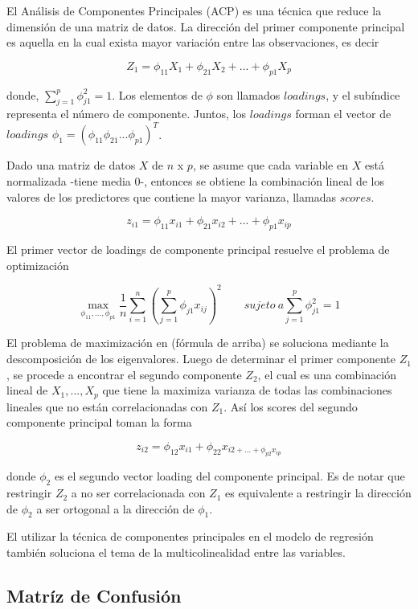 \documentclass[a4paper,12pt]{Latex/Classes/PhDthesisPSnPDF}
\begin{document}
El Análisis de Componentes Principales (ACP) es una técnica que reduce la dimensión de una matriz de datos. La dirección del primer componente principal es aquella en la cual exista mayor variación entre las observaciones, es decir

$$ Z_{1} = \phi_{11}X_{1} + \phi_{21}X_{2} + ... + \phi_{p1}X_{p} $$

donde, $ \sum_{j=1}^{p} \phi_{j1}^{2} = 1 $. Los elementos de $ \phi $ son llamados $loadings$, y el subíndice representa el número de componente. Juntos, los $loadings$ forman el vector de $loadings$ $\phi_{1} = (\phi_{11} \phi_{21}... \phi_{p1})^T$.

Dado una matriz de datos $X$ de $n$ x $p$, se asume que cada variable en $X$ está normalizada -tiene media 0-, entonces se obtiene la combinación lineal de los valores de los predictores que contiene la mayor varianza, llamadas $scores$.

$$ z_{i1} = \phi_{11} x_{i1} + \phi_{21} x_{i2} + ... + \phi_{p1} x_{ip} $$

El primer vector de loadings de componente principal resuelve el problema de optimización

$$ \max_{\phi_{11}, ..., \phi_{p1}}
\frac{1}{n} \sum_{i = 1}^{n} (\sum_{j=1}^{p} \phi_{j1} x_{ij})^2
\qquad sujeto \ a  \sum_{j=1}^{p} \phi_{j1}^{2} = 1
$$

El problema de maximización en (fórmula de arriba) se soluciona mediante la descomposición de los eigenvalores. Luego de determinar el primer componente $Z_{1}$, se procede a encontrar el segundo componente $Z_{2}$, el cual es una combinación lineal de $ X_{1}, ..., X_{p} $ que tiene la maximiza varianza de todas las combinaciones lineales que no están correlacionadas con $Z_{1}$. Así los scores del segundo componente principal toman la forma

$$ z_{i2} = \phi_{12}x_{i1} + \phi_{22}x_{i2 + ... + \phi_{p2}x_{ip}} $$

donde $\phi_{2}$ es el segundo vector loading del componente principal. Es de notar que restringir $Z_{2}$ a no ser correlacionada con $Z_{1}$ es equivalente a restringir la dirección de $\phi_{2}$ a ser ortogonal a la dirección de $\phi_{1}$.

El utilizar la técnica de componentes principales en el modelo de regresión también soluciona el tema de la multicolinealidad entre las variables. 

\subsection{Matríz de Confusión}
\end{document}
